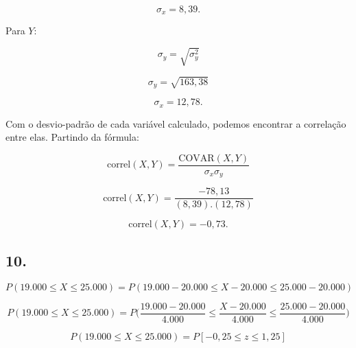 \documentclass[hidelinks,11pt]{book}
\theoremstyle{definition}
\begin{document}
\begin{displaymath}
	\sigma_x = 8,39.
\end{displaymath}

Para $Y$:

\begin{displaymath}
	\sigma_y = \sqrt{\sigma_y^2}
\end{displaymath}

\begin{displaymath}
	\sigma_y = \sqrt{163,38}
\end{displaymath}

\begin{displaymath}
	\sigma_x = 12,78.
\end{displaymath}


Com o desvio-padrão de cada variável calculado, podemos encontrar a correlação entre elas. Partindo da fórmula:


\begin{displaymath}
	\textrm{correl}(X,Y) =\frac{\textrm{COVAR}(X,Y)}{\sigma_x \sigma_y}
\end{displaymath}

\begin{displaymath}
	\textrm{correl}(X,Y) =\frac{-78,13}{(8,39).(12,78)}
\end{displaymath}

\begin{displaymath}
	\textrm{correl}(X,Y) = -0,73.
\end{displaymath}



	\subsection*{10.}


\begin{displaymath}
	P( 19.000 \leq X \leq 25.000) = P(19.000 - 20.000 \leq X - 20.000 \leq 25.000 - 20.000)
\end{displaymath}

\begin{displaymath}
	P( 19.000 \leq X \leq 25.000) = P\Bigg(\frac{19.000 - 20.000}{4.000} \leq \frac{X - 20.000}{4.000} \leq \frac{25.000 - 20.000}{4.000}\Bigg)
\end{displaymath}


\begin{displaymath}
	P( 19.000 \leq X \leq 25.000) = P[-0,25 \leq z \leq 1,25]
\end{displaymath}

\vspace{2em}
\end{document}
